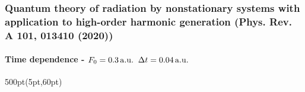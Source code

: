 \begin{frame}
\frametitle{Quantum theory of radiation by nonstationary systems 
	with application to high-order harmonic generation
        (Phys. Rev. A 101, 013410 (2020))}
	\framesubtitle{Time dependence - $F_0 = 0.3\,{\rm a.u.}\;\;
                          \Delta t= 0.04\,\rm a.u.$}
\small
\begin{textblock*}{500pt}(5pt,60pt)
 \begin{minipage}{0.0\linewidth}
 \begin{figure}[tp]
 \end{figure}

\end{minipage}
\end{textblock*}



\end{frame}
